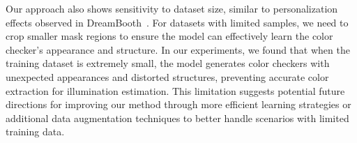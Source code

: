 Our approach also shows sensitivity to dataset size, similar to personalization effects observed in DreamBooth~\cite{ruiz2022dreambooth}. For datasets with limited samples, we need to crop smaller mask regions to ensure the model can effectively learn the color checker's appearance and structure. In our experiments, we found that when the training dataset is extremely small, the model generates color checkers with unexpected appearances and distorted structures, preventing accurate color extraction for illumination estimation. This limitation suggests potential future directions for improving our method through more efficient learning strategies or additional data augmentation techniques to better handle scenarios with limited training data.